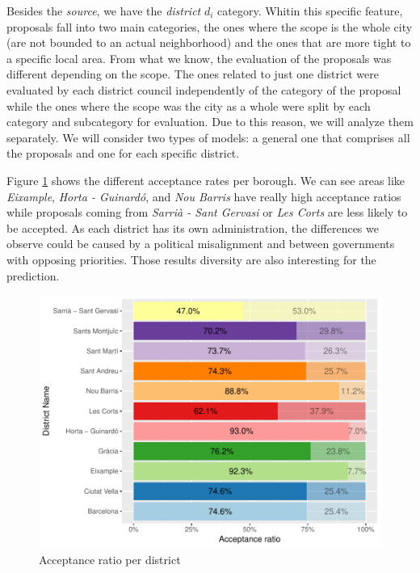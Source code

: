 Besides the \emph{source}, we have the \emph{district} $d_i$ category. Whitin this specific feature, proposals fall into two main categories, the ones where the scope is the whole city (are not bounded to an actual neighborhood) and the ones that are more tight to a specific local area. From what we know, the evaluation of the proposals was different depending on the scope. The ones related to just one district were evaluated by each district council independently of the category of the proposal while the ones where the scope was the city as a whole were split by each category and subcategory for evaluation. Due to this reason, we will analyze them separately. We will consider two types of models: a general one that comprises all the proposals and one for each specific district.

Figure \ref{district} shows the different acceptance rates per borough. We can see areas like \emph{Eixample}, \emph{Horta - Guinard\'o}, and \emph{Nou Barris} have really high acceptance ratios while proposals coming from \emph{Sarri\`a - Sant Gervasi} or \emph{Les Corts} are less likely to be accepted. As each district has its own administration, the differences we observe could be caused by a political misalignment and between governments with opposing  priorities. Those results diversity are also interesting for the prediction.

\begin{figure}[H]
\centering
\includegraphics[width=\textwidth]{Figures/district.pdf}
\caption{Acceptance ratio per district}
\label{district}
\end{figure}

